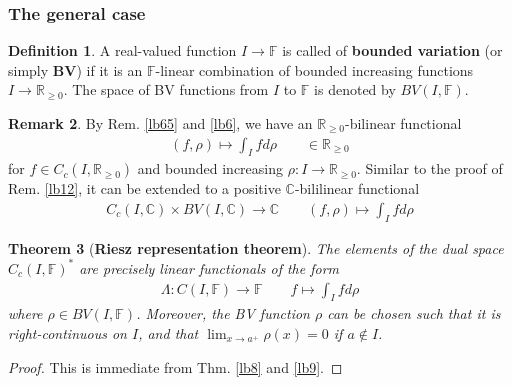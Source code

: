 \documentclass[12pt,b5paper,notitlepage]{article}
\theoremstyle{definition}
\newtheorem{df}{Definition}[subsection]
\newtheorem{rem}[df]{Remark}
\theoremstyle{plain}
\newtheorem{thm}[df]{Theorem}
\newcommand{\Cbb}{\mathbb C}
\newcommand{\Rbb}{\mathbb R}
\newcommand{\Fbb}{\mathbb F}
\numberwithin{equation}{section}
\begin{document}
\subsubsection{The general case}


\begin{df}
 A real-valued function $I\rightarrow\Fbb$ is called of \textbf{bounded variation} (or simply \textbf{BV})  if it is an $\Fbb$-linear combination of bounded increasing functions $I\rightarrow\Rbb_{\geq0}$. The space of BV functions from $I$ to $\Fbb$ is denoted by $BV(I,\Fbb)$. \index{BV@$BV(I,\Fbb)$}
\end{df}

\begin{rem}
By Rem. \ref{lb65} and \ref{lb6}, we have an $\Rbb_{\geq0}$-bilinear functional
\begin{align*}
(f,\rho)\mapsto \int_I fd\rho\qquad\in\Rbb_{\geq0}
\end{align*}
for $f\in C_c(I,\Rbb_{\geq0})$ and bounded increasing $\rho:I\rightarrow\Rbb_{\geq0}$. Similar to the proof of Rem. \ref{lb12}, it can be extended to a positive $\Cbb$-bililinear functional 
\begin{align*}
C_c(I,\Cbb)\times BV(I,\Cbb)\rightarrow\Cbb\qquad (f,\rho)\mapsto \int_I fd\rho
\end{align*}
\end{rem}


\begin{thm}[\textbf{Riesz representation theorem}]\label{lb10}
The elements of the dual space $C_c(I,\Fbb)^*$ are precisely linear functionals of the form
\begin{gather*}
\Lambda:C(I,\Fbb)\rightarrow\Fbb\qquad f\mapsto\int_I fd\rho
\end{gather*}
where $\rho\in BV(I,\Fbb)$. Moreover, the BV function $\rho$ can be chosen such that it is right-continuous on $I$, and that $\lim_{x\rightarrow a^+}\rho(x)=0$ if $a\notin I$.
\end{thm}

\begin{proof}
This is immediate from Thm. \ref{lb8} and \ref{lb9}.
\end{proof}







\newpage
\end{document}
